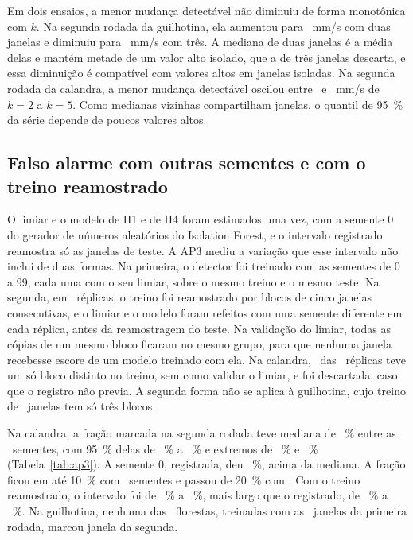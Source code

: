 Em dois ensaios, a menor mudança detectável não diminuiu de forma monotônica com $k$. Na segunda rodada da guilhotina, ela aumentou para \apDoisMmdGuilhotinaDoisDois~mm/s com duas janelas e diminuiu para \apDoisMmdGuilhotinaDoisTres~mm/s com três. A mediana de duas janelas é a média delas e mantém metade de um valor alto isolado, que a de três janelas descarta, e essa diminuição é compatível com valores altos em janelas isoladas. Na segunda rodada da calandra, a menor mudança detectável oscilou entre \apDoisMmdCalandraDoisQuatro\ e \apDoisMmdCalandraDoisTres~mm/s de $k = 2$ a $k = 5$. Como medianas vizinhas compartilham janelas, o quantil de \SI{95}{\percent} da série depende de poucos valores altos.

\subsection{Falso alarme com outras sementes e com o treino reamostrado}\label{sec:res-ap3}

O limiar e o modelo de H1 e de H4 foram estimados uma vez, com a semente 0 do gerador de números aleatórios do Isolation Forest, e o intervalo registrado reamostra só as janelas de teste. A AP3 mediu a variação que esse intervalo não inclui de duas formas. Na primeira, o detector foi treinado com as sementes de 0 a \num{99}, cada uma com o seu limiar, sobre o mesmo treino e o mesmo teste. Na segunda, em \apTresReplicas\ réplicas, o treino foi reamostrado por blocos de cinco janelas consecutivas, e o limiar e o modelo foram refeitos com uma semente diferente em cada réplica, antes da reamostragem do teste. Na validação do limiar, todas as cópias de um mesmo bloco ficaram no mesmo grupo, para que nenhuma janela recebesse escore de um modelo treinado com ela. Na calandra, \apTresDescartesCalandra\ das \apTresReplicas\ réplicas teve um só bloco distinto no treino, sem como validar o limiar, e foi descartada, caso que o registro não previa. A segunda forma não se aplica à guilhotina, cujo treino de \campoJanelasGuilhotinaUm\ janelas tem só três blocos.

Na calandra, a fração marcada na segunda rodada teve mediana de \apTresSementeCalandraMed~\% entre as \apTresSementes\ sementes, com \SI{95}{\percent} delas de \apTresSementeCalandraPInf~\% a \apTresSementeCalandraPSup~\% e extremos de \apTresSementeCalandraMin~\% e \apTresSementeCalandraMax~\% (Tabela~\ref{tab:ap3}). A semente 0, registrada, deu \hUmFracaoCalandra~\%, acima da mediana. A fração ficou em até \SI{10}{\percent} com \apTresSementeCalandraAteDez\ sementes e passou de \SI{20}{\percent} com \apTresSementeCalandraAcimaVinte. Com o treino reamostrado, o intervalo foi de \apTresTreinoInfCalandra~\% a \apTresTreinoSupCalandra~\%, mais largo que o registrado, de \hUmCalandraIFDiretoInf~\% a \hUmCalandraIFDiretoSup~\%. Na guilhotina, nenhuma das \apTresSementes\ florestas, treinadas com as \campoJanelasGuilhotinaUm\ janelas da primeira rodada, marcou janela da segunda.

